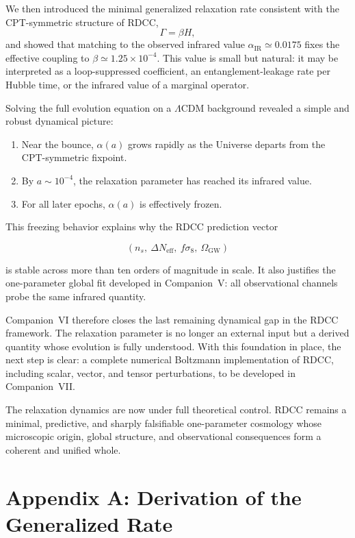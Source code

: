 \documentclass[11pt,a4paper]{article}
\begin{document}
We then introduced the minimal generalized relaxation rate consistent with the CPT-symmetric
structure of RDCC,
\begin{equation}
    \Gamma = \beta H,
\end{equation}
and showed that matching to the observed infrared value $\alpha_{\mathrm{IR}} \simeq 0.0175$ fixes the
effective coupling to $\beta \simeq 1.25\times 10^{-4}$. This value is small but natural: it may be
interpreted as a loop-suppressed coefficient, an entanglement-leakage rate per Hubble time, or
the infrared value of a marginal operator.

Solving the full evolution equation on a $\Lambda$CDM background revealed a simple and robust
dynamical picture:
\begin{enumerate}
    \item Near the bounce, $\alpha(a)$ grows rapidly as the Universe departs from the
    CPT-symmetric fixpoint.
    \item By $a \sim 10^{-4}$, the relaxation parameter has reached its infrared value.
    \item For all later epochs, $\alpha(a)$ is effectively frozen.
\end{enumerate}

This freezing behavior explains why the RDCC prediction vector


\[
    (n_s,\ \Delta N_{\mathrm{eff}},\ f\sigma_8,\ \Omega_{\mathrm{GW}})
\]


is stable across more than ten orders of magnitude in scale. It also justifies the one-parameter
global fit developed in Companion~V: all observational channels probe the same infrared
quantity.

Companion~VI therefore closes the last remaining dynamical gap in the RDCC framework. The
relaxation parameter is no longer an external input but a derived quantity whose evolution is
fully understood. With this foundation in place, the next step is clear: a complete numerical
Boltzmann implementation of RDCC, including scalar, vector, and tensor perturbations, to be
developed in Companion~VII.

The relaxation dynamics are now under full theoretical control. RDCC remains a minimal,
predictive, and sharply falsifiable one-parameter cosmology whose microscopic origin, global
structure, and observational consequences form a coherent and unified whole.

\appendix

\section*{Appendix A: Derivation of the Generalized Rate}
\end{document}
